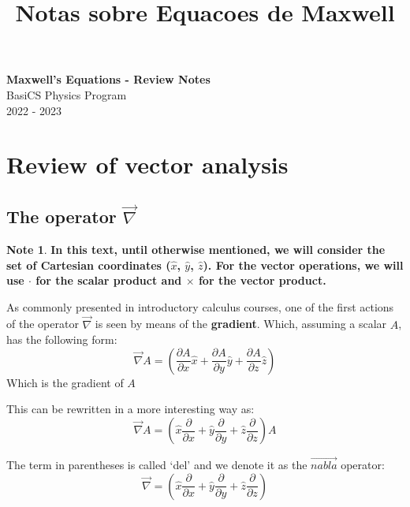 \documentclass[11pt]{article}
\theoremstyle{definition}
\newtheorem{note}{Note}
\begin{document}
\setcounter{section}{0}
\title{Notas sobre Equacoes de Maxwell}

\thispagestyle{empty}

\begin{center}
{\LARGE \bf Maxwell's Equations - Review Notes}\\
{\large BasiCS Physics Program}\\
2022 - 2023
\end{center}
\section{Review of vector analysis}
\subsection{The operator $\vec{\nabla}$}
\begin{note}
\textbf{In this text, until otherwise mentioned, we will consider the set of Cartesian coordinates ($\hat{x}$, $\hat{y}$, $\hat{z}$). For the
vector operations, we will use $\cdot$ for the scalar product and $\times$ for the vector product.}
\end{note}

As commonly presented in introductory calculus courses, one of the first actions of the operator $\vec{\nabla}$ is seen by means of the \textbf{gradient}.
Which, assuming a scalar $A$, has the following form:
\begin{equation}
\vec{\nabla} A = \left(\frac{\partial A}{\partial x}\hat{x}+\frac{\partial A}{\partial y}\hat{y}+\frac{\partial A}{\partial z}\hat{z}\right)
\end{equation}
Which is the gradient of $A$ 

This can be rewritten in a more interesting way as:
\begin{equation}
\vec{\nabla} A = \left(\hat{x}\frac{\partial}{\partial x}+\hat{y}\frac{\partial}{\partial y}+\hat{z}\frac{\partial}{\partial z}\right)A
\end{equation}

The term in parentheses is called `del' and we denote it as the $\vec{nabla}$ operator:
\begin{equation}
\vec{\nabla} = \left(\hat{x}\frac{\partial}{\partial x}+\hat{y}\frac{\partial}{\partial y}+\hat{z}\frac{\partial}{\partial z}\right)
\end{equation}
\end{document}
